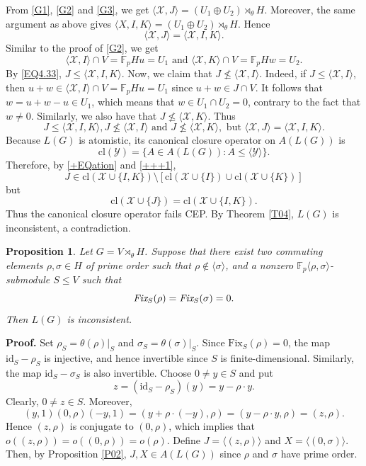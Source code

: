 \documentclass[12pt]{article}
\newtheorem{proposition}{\bf Proposition}[section]
\def\QEDopen{{\setlength{\fboxsep}{0pt}\setlength{\fboxrule}{0.2pt}\fbox{\rule[0pt]{0pt}{1.3ex}\rule[0pt]{1.3ex}{0pt}}}}
\def\QED{\QEDopen}
\def\proof{{\bf Proof.} }
\def\endproof{\hspace*{\fill}~\QED\par\endtrivlist\unskip}
\begin{document}
From \eqref{G1}, \eqref{G2} and \eqref{G3}, we get
$\langle\mathcal{X},J\rangle=(U_1\oplus U_2)\rtimes_\theta H$.
Moreover, the same argument as above gives
$\langle X,I,K\rangle=(U_1\oplus U_2)\rtimes_\theta H$.
Hence
\begin{equation}\label{EQ4.33}
\langle\mathcal{X},J\rangle=\langle\mathcal{X},I,K\rangle.\end{equation}
Similar to the proof of \eqref{G2}, we get 
$$\langle\mathcal{X},I\rangle\cap V=\mathbb{F}_{p}Hu=U_1\mbox{ and }\langle\mathcal{X},K\rangle\cap V=\mathbb{F}_{p}Hw=U_2.$$  
By \eqref{EQ4.33}, $J\leq \langle \mathcal{X},I,K\rangle$. Now, we claim that $J\nleq \langle \mathcal{X},I\rangle$. 
Indeed, if $J\leq \langle \mathcal{X},I\rangle$, then $u+w\in \langle \mathcal{X},I\rangle\cap V=\mathbb{F}_{p}Hu=U_1$ since $u+w\in J\cap V$.
It follows that $w=u+w-u\in U_1$, which means that $w\in U_1\cap U_2=0$, contrary to the fact that $w\neq 0$. Similarly, we also have that $J\nleq \langle \mathcal{X},K\rangle$. Thus \begin{equation}\label{+++1}
J\leq \langle \mathcal{X},I,K\rangle,J\nleq \langle \mathcal{X},I\rangle \mbox{ and }J\nleq \langle \mathcal{X},K\rangle, \mbox{ but } \langle \mathcal{X},J\rangle=\langle \mathcal{X},I,K\rangle.    
\end{equation} 
Because $L(G)$ is atomistic, its canonical closure operator on $A(L(G))$ is
$$\mbox{cl}(\mathcal{Y})=\{A\in A(L(G)):A\leq\langle\mathcal{Y}\rangle\}.$$
Therefore, by \eqref{+EQation} and \eqref{+++1},
$$J\in\mbox{cl}(\mathcal{X}\cup\{I,K\})
\setminus [\mbox{cl}(\mathcal{X}\cup\{I\})
\cup \mbox{cl}(\mathcal{X}\cup\{K\})]$$
but
$$\mbox{cl}(\mathcal{X}\cup\{J\})=\mbox{cl}(\mathcal{X}\cup\{I,K\}).$$
Thus the canonical closure operator fails CEP. By Theorem \ref{T04}, $L(G)$ is inconsistent, a contradiction.  
\endproof

\begin{proposition}\label{PRO4.2}
Let $G=V\rtimes_{\theta} H$. 
Suppose that there exist two commuting elements $\rho, \sigma \in H$ of prime order such that $\rho\notin \langle \sigma\rangle$, and a nonzero $\mathbb{F}_p\langle\rho,\sigma\rangle$-submodule
$S\leq V$ such that $$\emph{Fix}_S(\rho)=\emph{Fix}_S(\sigma)=0.$$ Then $L(G)$ is inconsistent.
\end{proposition}
\proof
Set $\rho_S=\theta(\rho)|_S$ and $\sigma_S=\theta(\sigma)|_S$. 
Since $\mbox{Fix}_S(\rho)=0$, the map $\mbox{id}_S-\rho_S$ is injective, and hence 
invertible since $S$ is finite-dimensional. Similarly, the map 
$\mbox{id}_S-\sigma_S$ is also invertible. Choose $0\neq y\in S$ and put 
$$z=(\mbox{id}_S-\rho_S)(y)=y-\rho\cdot y.$$ 
Clearly, $0\neq z\in S$. Moreover,
\begin{equation*}\label{EQ4.3}
(y,1)(0,\rho)(-y,1) =(y+\rho\cdot (-y),\rho) =(y-\rho\cdot y,\rho) =(z,\rho).
\end{equation*}
Hence $(z,\rho)$ is conjugate to $(0,\rho)$, which implies that $o((z,\rho))=o((0,\rho))=o(\rho)$. Define  $J=\langle (z,\rho)\rangle$ and $X=\langle (0,\sigma)\rangle$. Then, by Proposition \ref{P02}, $J,X\in A(L(G))$ since $\rho$ and $\sigma$ have prime order. 
\end{document}

